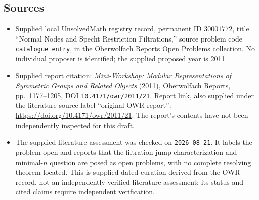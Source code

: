\documentclass[11pt]{article}
\begin{document}
\subsection{Sources}
\begin{itemize}
\item Supplied local UnsolvedMath registry record, permanent ID \(30001772\), title ``Normal Nodes and Specht Restriction Filtrations,'' source problem code \texttt{catalogue entry}, in the Oberwolfach Reports Open Problems collection. No individual proposer is identified; the supplied proposed year is 2011.
\item Supplied report citation: \emph{Mini-Workshop: Modular Representations of Symmetric Groups and Related Objects} (2011), Oberwolfach Reports, pp.\ 1177--1205, DOI \texttt{10.4171/owr/2011/21}. Report link, also supplied under the literature-source label ``original OWR report'': \url{https://doi.org/10.4171/owr/2011/21}. The report's contents have not been independently inspected for this draft.
\item The supplied literature assessment was checked on \texttt{2026-08-21}. It labels the problem open and reports that the filtration-jump characterization and minimal-\(n\) question are posed as open problems, with no complete resolving theorem located. This is supplied dated curation derived from the OWR record, not an independently verified literature assessment; its status and cited claims require independent verification.
\end{itemize}
\end{document}
